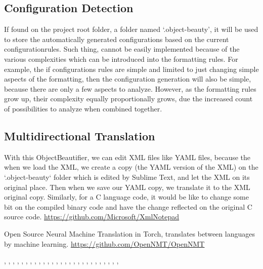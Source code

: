 \subsection{Configuration Detection}

If found on the project root folder,
a folder named `.object-beauty',
it will be used to store the automatically generated configurations based on the current configuration\s rules.
Such thing,
cannot be easily implemented because of the various complexities which can be introduced into the formatting rules.
For example,
the if configurations rules are simple and limited to just changing simple aspects of the formatting,
then the configuration generation will also be simple,
because there are only a few aspects to analyze.
However,
as the formatting rules grow up,
their complexity equally proportionally grows,
due the increased count of possibilities to analyze when combined together.


\subsection{Multidirectional Translation}

With this ObjectBeautifier,
we can edit XML files like YAML files,
because the when we load the XML,
we create a copy (the YAML version of the XML) on the `.object-beauty` folder which is edited by Sublime Text,
and let the XML on its original place.
Then when we save our YAML copy,
we translate it to the XML original copy.
Similarly,
for a C language code,
it would be like to change some bit on the compiled binary code and have the change reflected on the original C source code.
\url{https://github.com/Microsoft/XmlNotepad}

Open Source Neural Machine Translation in Torch,
translates between languages by machine learning.
\url{https://github.com/OpenNMT/OpenNMT}



,
,
,
,
,
,
,
,
,
,
,
,
,
,
,
,
,
,
,
,
,
,
,
,
,
,
,



